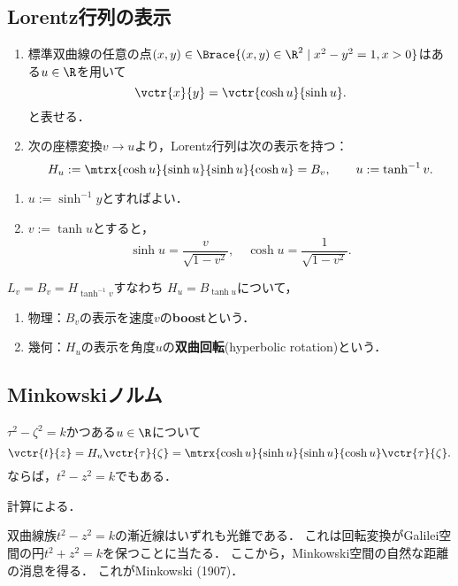 \documentclass[uplatex,dvipdfmx]{jsreport}
\begin{document}
\subsection{Lorentz行列の表示}

\begin{proposition}\mbox{}\label{prop-parametrization-of-hyperbola}
    \begin{enumerate}
        \item 標準双曲線の任意の点$(x,y)\in\Brace{(x,y)\in\R^2\mid x^2-y^2=1,x>0}$はある$u\in\R$を用いて
        \[\vctr{x}{y}=\vctr{\cosh u}{\sinh u}.\]
        と表せる．
        \item 次の座標変換$v\to u$より，Lorentz行列は次の表示を持つ：
        \[H_u:=\mtrx{\cosh u}{\sinh u}{\sinh u}{\cosh u}=B_v,\qquad u:=\tanh^{-1}v.\]
    \end{enumerate}
\end{proposition}
\begin{Proof}\mbox{}
    \begin{enumerate}
        \item $u:=\sinh^{-1}y$とすればよい．
        \item $v:=\tanh u$とすると，
        \[\sinh u=\frac{v}{\sqrt{1-v^2}},\quad\cosh u=\frac{1}{\sqrt{1-v^2}}.\]
    \end{enumerate}
\end{Proof}

\begin{remarks}
    $L_v=B_v=H_{\tanh^{-1}v}$すなわち
    $H_u=B_{\tanh u}$について，
    \begin{enumerate}
        \item 物理：$B_v$の表示を速度$v$の\textbf{boost}という．
        \item 幾何：$H_u$の表示を角度$u$の\textbf{双曲回転}(hyperbolic rotation)という．
    \end{enumerate}
\end{remarks}

\subsection{Minkowskiノルム}

\begin{theorem}[Lorentz変換は双曲線族を保つ]
    $\tau^2-\zeta^2=k$かつある$u\in\R$について
    \[\vctr{t}{z}=H_u\vctr{\tau}{\zeta}=\mtrx{\cosh u}{\sinh u}{\sinh u}{\cosh u}\vctr{\tau}{\zeta}.\]
    ならば，$t^2-z^2=k$でもある．
\end{theorem}
\begin{Proof}
    計算による．
\end{Proof}
\begin{remarks}
    双曲線族$t^2-z^2=k$の漸近線はいずれも光錐である．
    これは回転変換がGalilei空間の円$t^2+z^2=k$を保つことに当たる．
    ここから，Minkowski空間の自然な距離の消息を得る．
    これがMinkowski (1907)．
\end{remarks}
\end{document}

